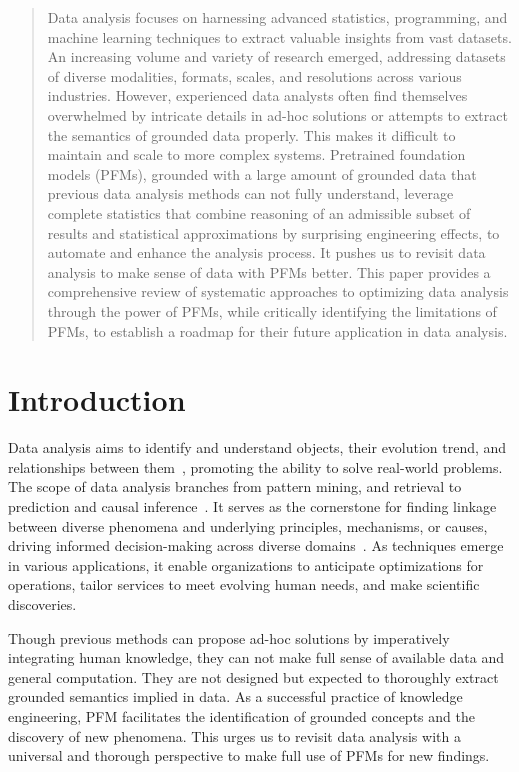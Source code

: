   \begin{abstract}
  Data analysis focuses on harnessing advanced statistics, programming, and machine learning techniques to extract valuable insights from vast datasets. An increasing volume and variety of research emerged, addressing datasets of diverse modalities, formats, scales, and resolutions across various industries. However, experienced data analysts often find themselves overwhelmed by intricate details in ad-hoc solutions or attempts to extract the semantics of grounded data properly. This makes it difficult to maintain and scale to more complex systems. Pretrained foundation models (PFMs), grounded with a large amount of grounded data that previous data analysis methods can not fully understand, leverage complete statistics that combine reasoning of an admissible subset of results and statistical approximations by surprising engineering effects, to automate and enhance the analysis process. It pushes us to revisit data analysis to make sense of data with PFMs better. This paper provides a comprehensive review of systematic approaches to optimizing data analysis through the power of PFMs, while critically identifying the limitations of PFMs, to establish a roadmap for their future application in data analysis.

  \end{abstract}
  
  \section{Introduction}
  Data analysis aims to identify and understand objects, their evolution trend, and relationships between them~\cite{3Wmodel,nisbet2009handbook}, promoting the ability to solve real-world problems. The scope of data analysis branches from pattern mining, and retrieval to prediction and causal inference~\cite{pearl2018book}. It serves as the cornerstone for finding linkage between diverse phenomena and underlying principles, mechanisms, or causes, driving informed decision-making across diverse domains~\cite{provost2013data}. As techniques emerge in various applications, it enable organizations to anticipate optimizations for operations, tailor services to meet evolving human needs, and make scientific discoveries. 
  
  Though previous methods can propose ad-hoc solutions by imperatively integrating human knowledge, they can not make full sense of available data and general computation. They are not designed but expected to thoroughly extract grounded semantics implied in data. As a successful practice of knowledge engineering, PFM facilitates the identification of grounded concepts and the discovery of new phenomena. This urges us to revisit data analysis with a universal and thorough perspective to make full use of PFMs for new findings.
  
